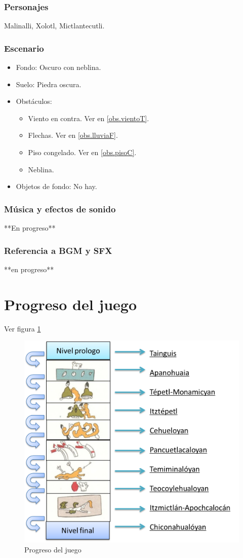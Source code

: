 \documentclass[11pt,letterpaper]{article}
\begin{document}
	\subsubsection{Personajes}
	Malinalli, Xolotl, Mictlantecutli.
	\subsubsection{Escenario}
\begin{itemize} 
	\item Fondo: Oscuro con neblina.
	\item Suelo: Piedra oscura.
	\item Obstáculos:
	\begin{itemize}		
		\item Viento en contra. Ver en \ref{obs.vientoT}.
		\item Flechas. Ver en \ref{obs.lluviaF}.
		\item Piso congelado. Ver en \ref{obs.pisoC}.
		\item Neblina.
	\end{itemize}
	\item Objetos de fondo: No hay.
\end{itemize}	
	\subsubsection{Música y efectos de sonido}
	**En progreso**
	\subsubsection{Referencia a BGM y SFX}
	**en progreso**
\section{Progreso del juego}
Ver figura \ref{fig:ProgJuego}
\begin{figure}
  \centering
     \includegraphics[width=\linewidth]{Imagenes/lineaJuego}
  \caption{Progreso del juego}
  \label{fig:ProgJuego}
\end{figure} 
\end{document}
